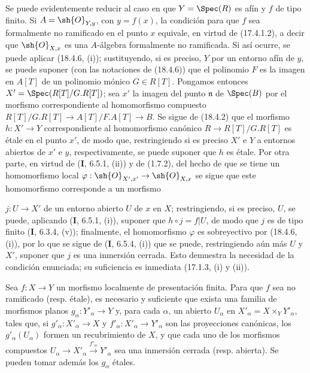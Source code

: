 Se puede evidentemente reducir al caso en que $Y=\Spec(R)$ es afín y $f$ de tipo finito. Si $A=\sh{O}_{Y,y}$, con $y=f(x)$, la condición para que $f$ sea formalmente no ramificado en el punto $x$ equivale, en virtud de (17.4.1.2), a decir que $\sh{O}_{X,x}$ es una $A$-álgebra formalmente no ramificada. Si así ocurre, se puede aplicar (18.4.6, (i)); sustituyendo, si es preciso, $Y$ por un entorno afín de $y$, se puede suponer (con las notaciones de (18.4.6)) que el polinomio $F$ es la imagen en $A[T]$ de un polinomio mónico $G\in R[T]$. Pongamos entonces $X'=\Spec(R[T]/G.R[T])$; sea $x'$ la imagen del punto $\mathfrak n$ de $\Spec(B)$ por el morfismo correspondiente al homomorfismo compuesto $R[T]/G.R[T]\to A[T]/F.A[T]\to B$. Se sigue de (18.4.2) que el morfismo $h:X'\to Y$ correspondiente al homomorfismo canónico $R\to R[T]/G.R[T]$ es étale en el punto $x'$, de modo que, restringiendo si es preciso $X'$ e $Y$ a entornos abiertos de $x'$ e $y$, respectivamente, se puede suponer que $h$ es étale. Por otra parte, en virtud de (\textbf I, 6.5.1, (ii)) y de (1.7.2), del hecho de que se tiene un homomorfismo local $\varphi:\sh{O}_{X',x'}\to\sh{O}_{X,x}$ se sigue que este homomorfismo corresponde a un morfismo


$j:U\to X'$ de un entorno abierto $U$ de $x$ en $X$; restringiendo, si es preciso, $U$, se puede, aplicando (\textbf I, 6.5.1, (i)), suponer que $h\circ j=f|U$, de modo que $j$ es de tipo finito (\textbf I, 6.3.4, (v)); finalmente, el homomorfismo $\varphi$ es sobreyectivo por (18.4.6, (i)), por lo que se sigue de (\textbf I, 6.5.4, (i)) que se puede, restringiendo aún más $U$ y $X'$, suponer que $j$ es una inmersión cerrada. Esto demuestra la necesidad de la condición enunciada; su suficiencia es inmediata (17.1.3, (i) y (ii)).

\begin{corollary}[18.4.8]
\label{IV.18.4.8}
Sea $f:X\to Y$ un morfismo localmente de presentación finita. Para que $f$ sea no ramificado \textup{(resp.} étale\textup{)}, es necesario y suficiente que exista una familia de morfismos planos $g_\alpha:Y'_\alpha\to Y$ y, para cada $\alpha$, un abierto $U_\alpha$ en $X'_\alpha=X\times_Y Y'_\alpha$, tales que, si $g'_\alpha:X'_\alpha\to X$ y $f'_\alpha:X'_\alpha\to Y'_\alpha$ son las proyecciones canónicas, los $g'_\alpha(U_\alpha)$ formen un recubrimiento de $X$, y que cada uno de los morfismos compuestos $U_\alpha\to X'_\alpha\xrightarrow{f'_\alpha}Y'_\alpha$ sea una inmersión cerrada \textup{(resp.} abierta\textup{)}. Se pueden tomar además los $g_\alpha$ étales.
\end{corollary}

